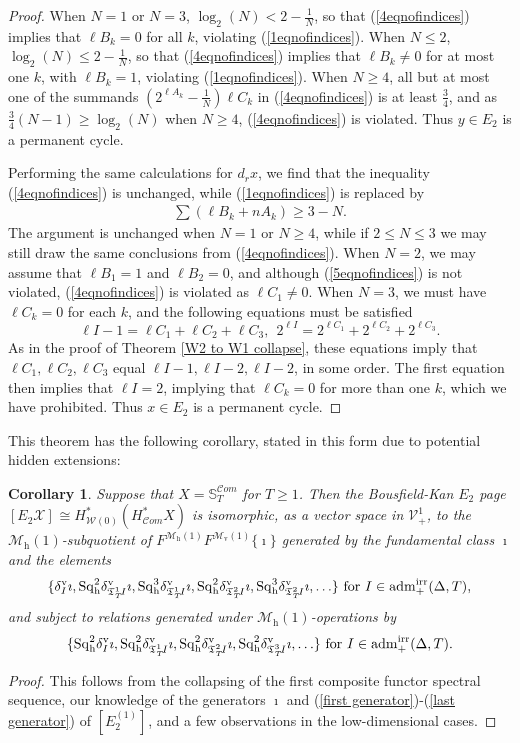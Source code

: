 \documentclass[11pt]{amsart} \renewcommand{\baselinestretch}{1.4}
\theoremstyle{plain}
\newtheorem{cor}[thm]{Corollary}
\theoremstyle{definition}
\newcommand{\scrC}{\mathscr{C}}
\newcommand{\calV}{\mathcal{V}}
\newcommand{\calw}{\mathcal{W}}
\newcommand{\calx}{\mathcal{X}}
\newcommand{\calMv}{\mathcal{M}\dver}
\newcommand{\calMh}{\mathcal{M}\dhor}
\newcommand{\vect}[2]{\calV^{#1}_{#2}}
\newcommand{\aDTirr}{\mathrm{adm}_+^\mathrm{irr}(\Delta,T)}
\newcommand{\algs}{{\scrC\!\textit{om}}}
\newcommand{\TOP}{\mathfrak{T}}
\newcommand{\E}[5]{[E^{#1}_{#2}#3]^{#4}_{#5}}
\newcommand{\uver}{^\mathrm{v}}
\newcommand{\dver}{_\mathrm{v}}
\newcommand{\dhor}{_\mathrm{h}}
\newcommand{\Sqh}{\mathrm{Sq}\dhor}
\newcommand{\deltav}{\delta\uver}
\begin{document}
\begin{Calculations of HWn for n nonzero}
\begin{proof}
When $N=1$ or $N=3$, $\log_2(N)<2-\frac{1}{N}$, so that (\ref{4eqnofindices}) implies that $\ell B_k=0$ for all $k$, violating (\ref{1eqnofindices}).
When $N\leq2$, $\log_2(N)\leq 2-\frac{1}{N}$, so that (\ref{4eqnofindices}) implies that $\ell B_k\neq0$ for at most one $k$, with $\ell B_k=1$, violating (\ref{1eqnofindices}).
When $N\geq4$, all but at most one of the summands $(2^{\ell A_k}-\frac{1}{N})\ell C_k$ in (\ref{4eqnofindices}) is at least $\frac{3}{4}$, and as $\frac{3}{4}(N-1)\geq\log_2(N)$ when $N\geq4$, (\ref{4eqnofindices}) is violated. Thus $y\in E_2$ is a permanent cycle.

Performing the same calculations for $d_rx$, we find that the inequality (\ref{4eqnofindices}) is unchanged, while (\ref{1eqnofindices}) is replaced by
\begin{gather}
\textstyle \sum(\ell B_k+nA_k)\geq3-N.\label{5eqnofindices}\end{gather}
The argument is unchanged when $N=1$ or $N\geq4$, while if $2\leq N\leq3$ we may still draw the same conclusions from (\ref{4eqnofindices}). When $N=2$, we may assume that $\ell B_1=1$ and $\ell B_2=0$, and although (\ref{5eqnofindices}) is not violated, (\ref{4eqnofindices}) is violated as $\ell C_1\neq0$. When $N=3$, we must have $\ell C_k=0$ for each $k$, and the following equations must be satisfied
\[\ell I-1=\ell C_1+\ell C_2+\ell C_3,\ \  2^{\ell I}=2^{\ell C_1}+2^{\ell C_2}+2^{\ell C_3}.\]
As in the proof of Theorem \ref{W2 to W1 collapse}, these equations imply that $\ell C_1,\ell C_2,\ell C_3$ equal $\ell I-1,\ell I-2,\ell I-2$, in some order. The first equation then implies that $\ell I=2$, implying that $\ell C_k=0$ for more than one $k$, which we have prohibited. Thus $x\in E_2$ is a permanent cycle.
\end{proof}
This theorem has the following corollary, stated in this form due to potential hidden extensions:
\begin{cor}
\label{the corollary on the bousfield kan e2}
Suppose that $X=\mathbb{S}_{T}^{\algs}$ for $T\geq1$. Then the Bousfield-Kan $E_2$ page $\E{}{2}{\calx}{}{}\cong H^*_{\calw(0)}(H^*_\algs X)$ is isomorphic, as a vector space in $\vect{1}{+}$, to the $\calMh(1)$-subquotient of $F^{\calMh(1)}F^{\calMv(1)}\{\imath\}$ generated by 
the fundamental class $\imath$ and the elements
\[
\{\deltav_{I}\imath,
\Sqh^2\deltav_{\TOP_T^1\!I}\imath,\Sqh^3\deltav_{\TOP_T^1\!I}\imath,
\Sqh^2\deltav_{\TOP_T^2\!I}\imath,\Sqh^3\deltav_{\TOP_T^2\!I}\imath,
\ldots\}\textup{ for $I\in\aDTirr$,}
\]
and subject to  relations generated under $\calMh(1)$-operations by
\[\{
\Sqh^2\deltav_{I}\imath,
\Sqh^2\deltav_{\TOP_T^1\!I}\imath,
\Sqh^2\deltav_{\TOP_T^2\!I}\imath,
\Sqh^2\deltav_{\TOP_T^3\!I}\imath,
\ldots\}\textup{ for $I\in\aDTirr$.}
\]
\end{cor}
\begin{proof}
This follows from the collapsing of the first composite functor spectral sequence, our knowledge of the generators $\imath$ and (\ref{first generator})-(\ref{last generator}) of $\E{(1)}{2}{}{}{}$, and  a few observations in the low-dimensional cases. 


\end{proof}
\end{Calculations of HWn for n nonzero}
\end{document}
